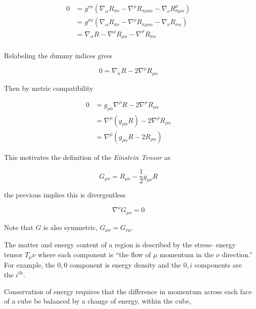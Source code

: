 \begin{align*}
0 &= g^{\sigma\nu}
\left(\nabla_\alpha R_{\sigma\nu}
- \nabla^\rho R_{\sigma\rho\nu\alpha}
- \nabla_\nu R^\mu_{\sigma\mu\alpha}\right) \\
&= g^{\sigma\nu}
\left(\nabla_\alpha R_{\sigma\nu}
- \nabla^\rho R_{\sigma\rho\nu\alpha}
- \nabla_\nu R_{\sigma\alpha}\right) \\
&= \nabla_\alpha R
- \nabla^\rho R_{\rho\alpha}
- \nabla^\sigma R_{\sigma\alpha} \\
\end{align*}

Relabeling the dummy indices gives

\begin{equation*}
0 = \nabla_\alpha R - 2 \nabla^\rho R_{\rho\alpha}
\end{equation*}

Then by metric compatibility

\begin{align*}
0 &= g_{\rho\alpha} \nabla^\rho R - 2 \nabla^\rho R_{\rho\alpha} \\
&= \nabla^\rho (g_{\rho\alpha} R) - 2 \nabla^\rho R_{\rho\alpha} \\
&= \nabla^\rho \left(g_{\rho\alpha} R - 2 R_{\rho\alpha} \right)
\end{align*}

This motivates the definition of the \emph{Einstein Tensor} as

\begin{equation}
\label{eq:einstein_tensor}
G_{\mu\nu} = R_{\mu\nu} - \frac{1}{2} g_{\mu\nu} R
\end{equation}

the previous implies this is divergentless

\begin{equation*}
\nabla^\nu G_{\mu\nu} = 0
\end{equation*}

Note that $G$ is also symmetric, $G_{\mu\nu} = G_{\nu\mu}$.


The matter and energy content of a region is described by the stress-
energy tensor $T_\mu\nu$ where each component is ``the flow of $\mu$
momentum in the $\nu$ direction.''  For example, the $0,0$ component
is energy density and the $0,i$ components are the $i^\mathrm{th}$.

Conservation of energy requires that the difference in momentum
across each face of a cube be balanced by a change of energy,
within the cube,

